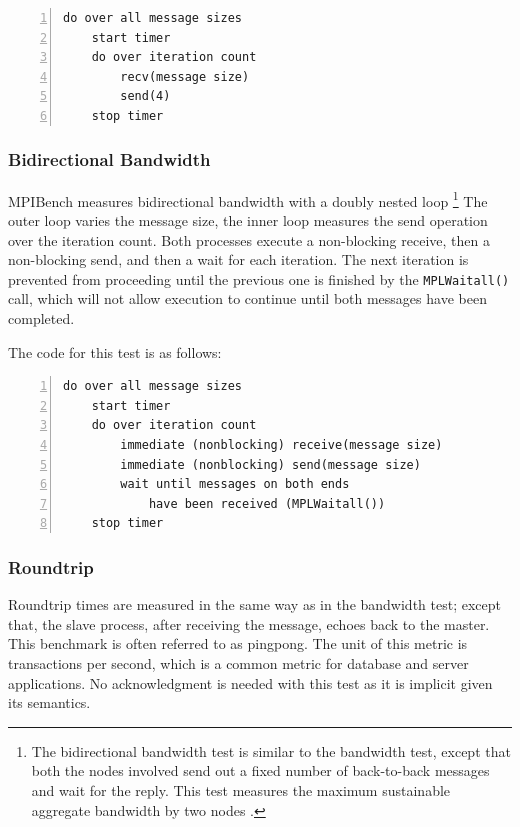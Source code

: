 \begin{minipage}{\textwidth}
\begin{lstlisting}[frame=single,numbers=left]
do over all message sizes 
    start timer
    do over iteration count 
        recv(message size) 
        send(4)
    stop timer
\end{lstlisting}
 \end{minipage}

\subsubsection{Bidirectional Bandwidth}

MPIBench measures bidirectional bandwidth with a doubly nested loop \footnote{
The bidirectional bandwidth test is similar to the bandwidth test, except that
both the nodes involved send out a fixed number of back-to-back messages and
wait for the reply. This test measures the maximum sustainable aggregate
bandwidth by two nodes \cite{mpibench}.} The outer loop varies the message size, the inner loop
measures the send operation over the iteration count. Both processes execute a
non-blocking receive, then a non-blocking send, and then a wait for each
iteration. The next iteration is prevented from proceeding until the previous
one is finished by the \texttt{MPLWaitall()} call, which will not allow
execution to continue until both messages have been completed.

The code for this test is as follows:
 
\begin{minipage}{\textwidth}
\end{minipage}

\begin{minipage}{\textwidth}
\begin{lstlisting}[frame=single,numbers=left]
 do over all message sizes
    start timer
    do over iteration count
        immediate (nonblocking) receive(message size)
        immediate (nonblocking) send(message size)
        wait until messages on both ends 
            have been received (MPLWaitall())
    stop timer
\end{lstlisting}
\end{minipage}

\subsubsection{Roundtrip}

Roundtrip times are measured in the same way as in the bandwidth test; except that,
the slave process, after receiving the message, echoes back to the master.
This benchmark is often referred to as pingpong. The unit of this metric is
transactions per second, which is a common metric for database and server
applications. No acknowledgment is needed with this test as it is implicit
given its semantics.

